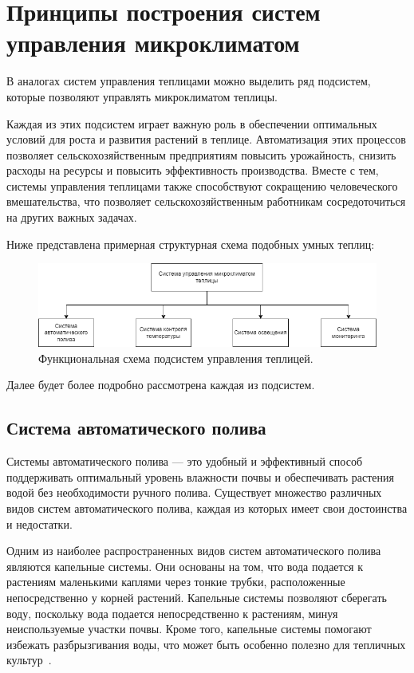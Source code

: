\chapter{Принципы построения систем управления микроклиматом}

В аналогах систем управления теплицами можно выделить ряд подсистем, которые позволяют управлять микроклиматом теплицы.

Каждая из этих подсистем играет важную роль в обеспечении оптимальных условий для роста и развития растений в теплице. Автоматизация этих процессов позволяет сельскохозяйственным предприятиям повысить урожайность, снизить расходы на ресурсы и повысить эффективность производства. Вместе с тем, системы управления теплицами также способствуют сокращению человеческого вмешательства, что позволяет сельскохозяйственным работникам сосредоточиться на других важных задачах.

Ниже представлена примерная структурная схема подобных умных теплиц:

\begin{figure}[H]
    \centering
    \includegraphics[scale=0.6]{images/system_schem.png}
    \caption{Функциональная схема подсистем управления теплицей.}
    \label{fig:system_schem}
\end{figure}

Далее будет более подробно рассмотрена каждая из подсистем.

\section{Система автоматического полива}

Системы автоматического полива --- это удобный и эффективный способ поддерживать оптимальный уровень влажности почвы и обеспечивать растения водой без необходимости ручного полива. Существует множество различных видов систем автоматического полива, каждая из которых имеет свои достоинства и недостатки.

Одним из наиболее распространенных видов систем автоматического полива являются капельные системы. Они основаны на том, что вода подается к растениям маленькими каплями через тонкие трубки, расположенные непосредственно у корней растений. Капельные системы позволяют сберегать воду, поскольку вода подается непосредственно к растениям, минуя неиспользуемые участки почвы. Кроме того, капельные системы помогают избежать разбрызгивания воды, что может быть особенно полезно для тепличных культур~\cite{Watering,Watering2}.

